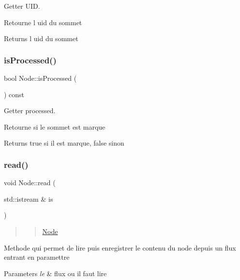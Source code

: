 Getter U\+ID. 

Retourne l uid du sommet

\begin{DoxyReturn}{Returns}
l uid du sommet 
\end{DoxyReturn}
\mbox{\label{class_node_a1fa00bc88d4a66614ee06c913dbda27f}} 
\subsubsection{\texorpdfstring{is\+Processed()}{isProcessed()}}
{\footnotesize\ttfamily bool Node\+::is\+Processed (\begin{DoxyParamCaption}{ }\end{DoxyParamCaption}) const}



Getter processed. 

Retourne si le sommet est marque

\begin{DoxyReturn}{Returns}
true si il est marque, false sinon 
\end{DoxyReturn}
\mbox{\label{class_node_ac59311eb42715f4a1f04a225618cace8}} 
\subsubsection{\texorpdfstring{read()}{read()}}
{\footnotesize\ttfamily void Node\+::read (\begin{DoxyParamCaption}\item[{std\+::istream \&}]{is }\end{DoxyParamCaption})}



\begin{quote}
\begin{quote}
\mbox{\hyperlink{class_node}{Node}}\end{quote}
\end{quote}


Methode qui permet de lire puis enregistrer le contenu du node depuis un flux entrant en paramettre


\begin{DoxyParams}{Parameters}
{\em le} & flux ou il faut lire \\
\hline
\end{DoxyParams}
\mbox{\label{class_node_a07d96eb3ce03cacd2b5a2af10365bc37}} 
